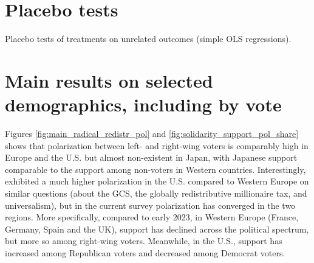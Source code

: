 \section{Placebo tests}\label{app:placebo}


\begin{table}[!htbp] 
  \caption{Placebo tests of treatments on unrelated outcomes (simple OLS regressions).} \label{tab:placebo} 
  \makebox[\textwidth][c]{}
\end{table} 


\clearpage
\section{Main results on selected demographics, including by vote}\label{app:pol}

Figures \ref{fig:main_radical_redistr_pol} and \ref{fig:solidarity_support_pol_share} shows that polarization between left- and right-wing voters is comparably high in Europe and the U.S. but almost non-existent in Japan, with Japanese support comparable to the support among non-voters in Western countries. Interestingly, \cite{fabre_majority_2025} exhibited a much higher polarization in the U.S. compared to Western Europe on similar questions (about the GCS, the globally redistributive millionaire tax, and universalism), but in the current survey polarization has converged in the two regions. More specifically, compared to early 2023, in Western Europe (France, Germany, Spain and the UK), support has declined across the political spectrum, but more so among right-wing voters. Meanwhile, in the U.S., support has increased among Republican voters and decreased among Democrat voters. 

